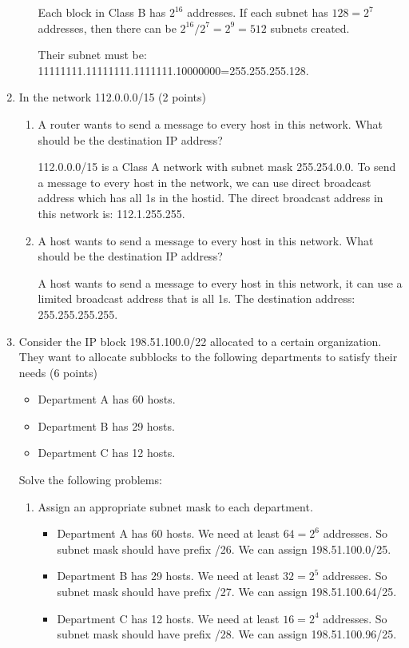 \documentclass{article}
\begin{document}
\begin{enumerate}
\begin{enumerate}
    Each block in Class B has $2^{16}$ addresses. If each subnet has $128=2^7$ addresses, then there can be $2^{16}/2^7=2^9=512$ subnets created.

    Their subnet must be: 11111111.11111111.1111111.10000000=255.255.255.128.
  \end{enumerate}
  \item In the network 112.0.0.0/15 (2 points)
  \begin{enumerate}
    \item A router wants to send a message to every host in this network. What should be the destination IP address?

    112.0.0.0/15 is a Class A network with subnet mask 255.254.0.0.
    To send a message to every host in the network, we can use direct broadcast address which has all 1s in the hostid.
    The direct broadcast address in this network is: 112.1.255.255.

    \item A host wants to send a message to every host in this network. What should be the destination IP address?

    A host wants to send a message to every host in this network, it can use a limited broadcast address that is all 1s.
    The destination address: 255.255.255.255.
  \end{enumerate}
  \item Consider the IP block 198.51.100.0/22 allocated to a certain organization. They want to allocate subblocks to the following departments to satisfy their needs (6 points)
  \begin{itemize}
    \item Department A has 60 hosts.
    \item Department B has 29 hosts.
    \item Department C has 12 hosts.
  \end{itemize}
  Solve the following problems:

  \begin{enumerate}
    \item Assign an appropriate subnet mask to each department.
    \begin{itemize}
      \item Department A has 60 hosts. We need at least $64=2^6$ addresses.
      So subnet mask should have prefix /26. We can assign 198.51.100.0/25.
      \item Department B has 29 hosts. We need at least $32=2^5$ addresses.
      So subnet mask should have prefix /27. We can assign 198.51.100.64/25.
      \item Department C has 12 hosts. We need at least $16=2^4$ addresses.
      So subnet mask should have prefix /28. We can assign 198.51.100.96/25.
    \end{itemize}


\end{enumerate}
\end{enumerate}
\end{document}
